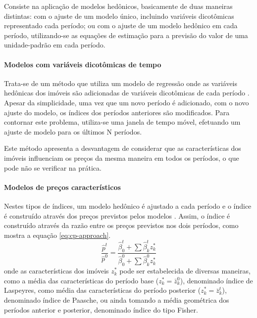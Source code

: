 \documentclass[
	12pt,				%
	oneside,			%
	a4paper,			%
	chapter=TITLE,		%
	section=TITLE,		%
	english,			%
	brazil				%
	]{abntex2}
\begin{document}
\begin{refsection}
Consiste na aplicação de modelos hedônicos, basicamente de duas maneiras
distintas: com o ajuste de um modelo único, incluindo variáveis dicotômicas
representado cada período; ou com o ajuste de um modelo hedônico em cada
período, utilizando-se as equações de estimação para a previsão do valor de uma
unidade-padrão em cada período.

\hypertarget{modelos-com-variuxe1veis-dicotuxf4micas-de-tempo}{%
\paragraph{Modelos com variáveis dicotômicas de tempo}\label{modelos-com-variuxe1veis-dicotuxf4micas-de-tempo}}

Trata-se de um método que utiliza um modelo de regressão onde as variáveis
hedônicas dos imóveis são adicionadas de variáveis dicotômicas de cada período
\autocite[158]{rppi}. Apesar da simplicidade, uma vez que um novo período é adicionado,
com o novo ajuste do modelo, os índices dos períodos anteriores são modificados.
Para contornar este problema, utiliza-se uma janela de tempo móvel, efetuando um
ajuste de modelo para os últimos N períodos.

Este método apresenta a desvantagem de considerar que as características dos
imóveis influenciam os preços da mesma maneira em todos os períodos, o que pode
não se verificar na prática.

\hypertarget{modelos-de-preuxe7os-caracteruxedsticos}{%
\paragraph{Modelos de preços característicos}\label{modelos-de-preuxe7os-caracteruxedsticos}}

Nestes tipos de índices, um modelo hedônico é ajustado a cada período e o índice
é construído através dos preços previstos pelos modelos \autocite[53]{rppi}. Assim, o
índice é construído através da razão entre os preços previstos nos dois
períodos, como mostra a equação \eqref{eq:cp-approach}.
\begin{equation}
\frac{\hat p^t}{\hat p^0} = \frac{\hat \beta_0^t + \sum \hat \beta_k^t z_k^*}{\hat \beta_0^0 + \sum \hat \beta_k^0 z_k^*}
\label{eq:cp-approach}
\end{equation}
onde as características dos imóveis \(z_k^*\) pode ser estabelecida de diversas
maneiras, como a média das características do período base (\(z_k^* = \bar z_k^0\)),
denominado índice de Laspeyres, como média das características do período
posterior (\(z_k^* = \bar z_k^t\)), denominado índice de Paasche, ou ainda tomando
a média geométrica dos períodos anterior e posterior, denominado índice do tipo
Fisher.


\end{refsection}
\end{document}
